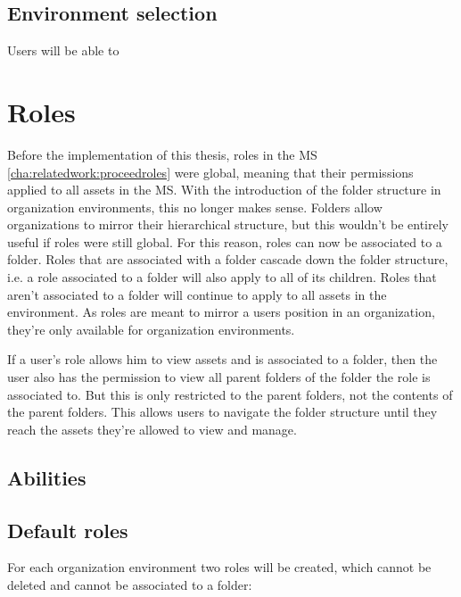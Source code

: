 \subsection{Environment selection}

Users will be able to 

\section{Roles}
\label{cha:conceptanddesign:roles}

Before the implementation of this thesis, roles in the MS
\ref{cha:relatedwork:proceedroles} were global,
meaning that their permissions applied to all assets in the MS.
With the introduction of the folder structure in organization environments, this no longer makes sense.
Folders allow organizations to mirror their hierarchical structure, but this wouldn't be
entirely useful if roles were still global.
For this reason, roles can now be associated to a folder.
Roles that are associated with a folder cascade down the
folder structure, i.e. a role associated to a folder will also apply to all of its children.
Roles that aren't associated to a folder will continue to apply to all assets in the environment.
As roles are meant to mirror a users position in an organization, they're only available
for organization environments.


If a user's role allows him to view assets and is associated to a folder, then the user
also has the permission to view all parent folders of the folder the role is associated to.
But this is only restricted to the parent folders, not the contents of the parent folders.
This allows users to navigate the folder structure until they reach the assets they're
allowed to view and manage.


\subsection{Abilities}

\subsection{Default roles}

For each organization environment two roles will be created, which cannot be deleted and
cannot be associated to a folder:

